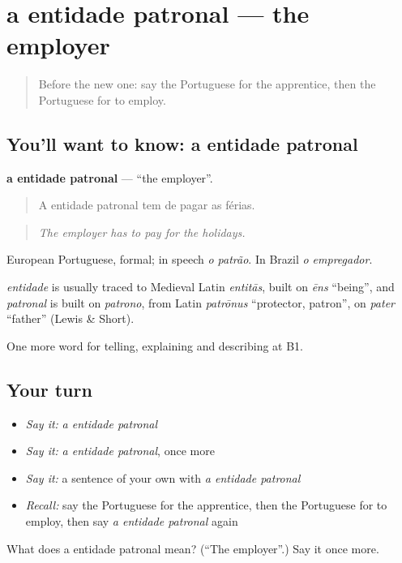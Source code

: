 \section[a entidade patronal]{a entidade patronal — the employer}

\label{lesson:PT-C357-entidade-patronal}



\begin{quote}
Before the new one: say the Portuguese for the apprentice, then the Portuguese for to employ.
\end{quote}

\subsection*{You'll want to know: a entidade patronal}
\textbf{a entidade patronal} — \textquotedblleft{}the employer\textquotedblright{}.

\begin{quote}
A entidade patronal tem de pagar as férias.
\end{quote}

\begin{quote}
\emph{The employer has to pay for the holidays.}
\end{quote}

European Portuguese, formal; in speech \emph{o patrão}. In Brazil \emph{o empregador}.

\begin{cousinweb}
\emph{entidade} is usually traced to Medieval Latin \emph{entitās}, built on \emph{ēns} \textquotedblleft{}being\textquotedblright{}, and \emph{patronal} is built on \emph{patrono}, from Latin \emph{patrōnus} \textquotedblleft{}protector, patron\textquotedblright{}, on \emph{pater} \textquotedblleft{}father\textquotedblright{} (Lewis \& Short).
\end{cousinweb}

\begin{grammarlens}[title={What you've built}]
One more word for telling, explaining and describing at B1.
\end{grammarlens}

\subsection*{Your turn}
\begin{itemize}
\raggedright
  \item \emph{Say it:} \emph{a entidade patronal}
  \item \emph{Say it:} \emph{a entidade patronal}, once more
  \item \emph{Say it:} a sentence of your own with \emph{a entidade patronal}
  \item \emph{Recall:} say the Portuguese for the apprentice, then the Portuguese for to employ, then say \emph{a entidade patronal} again
\end{itemize}

\begin{tcolorbox}[breakable,colback=teal!4,colframe=teal!35!black,title={Before you move on}]
What does a entidade patronal mean? (\textquotedblleft{}The employer\textquotedblright{}.) Say it once more.
\end{tcolorbox}
